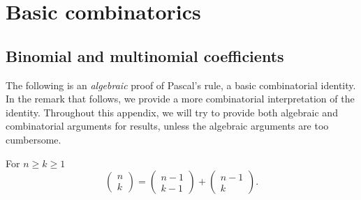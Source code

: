 
\chapter{Basic combinatorics\label{chap:Combinatorics}}

\section{Binomial and multinomial coefficients}

The following is an \emph{algebraic }proof of Pascal's rule, a basic
combinatorial identity. In the remark that follows, we provide a more
combinatorial interpretation of the identity. Throughout this appendix,
we will try to provide both algebraic and combinatorial arguments
for results, unless the algebraic arguments are too cumbersome.
\begin{prop}
\label{prop:pascalRule}For $n\geq k\geq1$
\[
\left(\begin{array}{c}
n\\
k
\end{array}\right)=\left(\begin{array}{c}
n-1\\
k-1
\end{array}\right)+\left(\begin{array}{c}
n-1\\
k
\end{array}\right).
\]
\end{prop}

